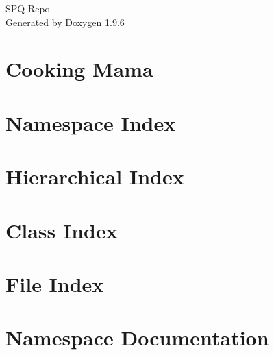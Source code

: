\documentclass[twoside]{book}
\newcommand{\+}{\discretionary{\mbox{\scriptsize$\hookleftarrow$}}{}{}}
\newcommand{\clearemptydoublepage}{%
    \newpage{\pagestyle{empty}\cleardoublepage}%
  }
\begin{document}
  \raggedbottom
    \hypersetup{pageanchor=false,
                bookmarksnumbered=true,
                pdfencoding=unicode
               }
  \begin{titlepage}
  \vspace*{7cm}
  \begin{center}%
  {\Large SPQ-\/\+Repo}\\
  \vspace*{1cm}
  {\large Generated by Doxygen 1.9.6}\\
  \end{center}
  \end{titlepage}
  \clearemptydoublepage
  \tableofcontents
  \clearemptydoublepage
  \hypersetup{pageanchor=true}
\chapter{Cooking Mama}
\label{md__d___pasar__universidad__s_p_q__repo__r_e_a_d_m_e}

\chapter{Namespace Index}

\chapter{Hierarchical Index}

\chapter{Class Index}

\chapter{File Index}

\chapter{Namespace Documentation}







\end{document}

